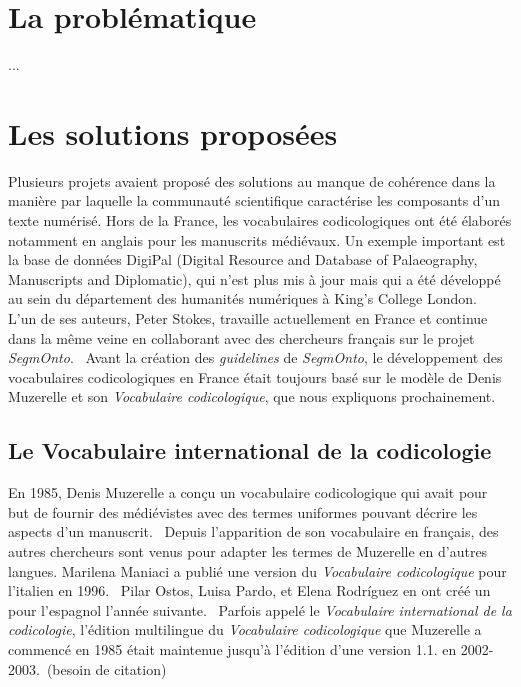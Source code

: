 \documentclass[class=article, crop=false]{standalone}
\begin{document}
	
\section{La problématique}

...

\section{Les solutions proposées}

Plusieurs projets avaient proposé des solutions au manque de cohérence dans la manière par laquelle la communauté scientifique caractérise les composants d'un texte numérisé. Hors de la France, les vocabulaires codicologiques ont été élaborés notamment en anglais pour les manuscrits médiévaux. Un exemple important est la base de données DigiPal (Digital Resource and Database of Palaeography, Manuscripts and Diplomatic), qui n'est plus mis à jour mais qui a été développé au sein du département des humanités numériques à King's College London. ~\cite{noauthor_digipal_2011} L'un de ses auteurs, Peter Stokes, travaille actuellement en France et continue dans la même veine en collaborant avec des chercheurs français sur le projet \textit{SegmOnto}.~\cite{gabay_segmonto_2021} Avant la création des \textit{guidelines} de \textit{SegmOnto}, le développement des vocabulaires codicologiques en France était toujours basé sur le modèle de Denis Muzerelle et son \textit{Vocabulaire codicologique}, que nous expliquons prochainement.

\subsection{Le Vocabulaire international de la codicologie}

En 1985, Denis Muzerelle a conçu un vocabulaire codicologique qui avait pour but de fournir des médiévistes avec des termes uniformes pouvant décrire les aspects d'un manuscrit.~\cite{muzerelle_vocabulaire_1985} Depuis l'apparition de son vocabulaire en français, des autres chercheurs sont venus pour adapter les termes de Muzerelle en d'autres langues. Marilena Maniaci a publié une version du \textit{Vocabulaire codicologique} pour l'italien en 1996.~\cite{maniaci_terminologia_1996} Pilar Ostos, Luisa Pardo, et Elena Rodríguez en ont créé un pour l'espagnol l'année suivante.~\cite{ostos_vocabulario_1997} Parfois appelé le \textit{Vocabulaire international de la codicologie}, l'édition multilingue du \textit{Vocabulaire codicologique} que Muzerelle a commencé en 1985 était maintenue jusqu'à l'édition d'une version 1.1. en 2002-2003.~(besoin de citation)
\end{document}
